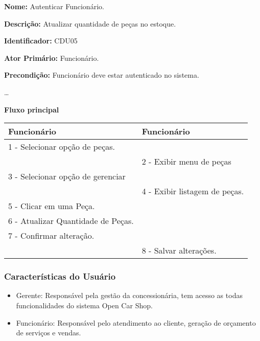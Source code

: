 	\par
	\textbf{Nome:} Autenticar Funcionário.
	\par
	\textbf{Descrição:}  Atualizar quantidade de peças no estoque.	
	\par 
	\textbf{Identificador:} CDU05
	\par
	\textbf{Ator Primário:} Funcionário.	
	\par
	\textbf{Precondição:} Funcionário deve estar autenticado no sistema.
	\par
	\ldots
	\par
	\textbf{Fluxo principal}\par
	\begin{tabular}{|p{7cm}|p{7cm}|}
		\hline 
		
		
		Funcionário
		& 
		
		Funcionário
		\\ 
		\hline 
		
		
		1 - Selecionar opção de peças.
		&  \\ 
		\hline 
		& 
		
		2 - Exibir menu de peças
		\\ 
		\hline 
		
		
		3 - Selecionar opção de gerenciar
		&  \\ 
		\hline 
		& 
		
		4 - Exibir listagem de peças.
		\\ 
		\hline 
		
		
		5 - Clicar em uma Peça.
		&  \\ 
		\hline 
		
		
		6 - Atualizar Quantidade de Peças.
		&  \\ 
		\hline 
		
		
		7 - Confirmar alteração.
		&  \\ 
		\hline 
		& 
		
		8 - Salvar alterações.
		\\ 
		\hline 
	\end{tabular} 
	\vspace{12px}	
	
	\subsubsection{Características do Usuário}
	
	\begin{itemize}
	\item[] Gerente: Responsável pela gestão da concessionária, tem acesso as todas   funcionalidades  do sistema Open Car Shop.
	\item[] Funcionário: Responsável pelo atendimento ao cliente, geração de orçamento de serviços e vendas.
	\end{itemize}

